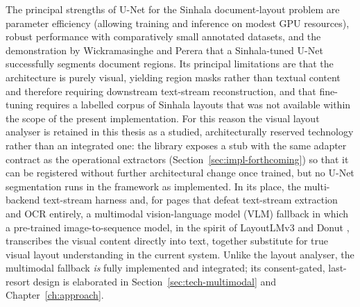 \documentclass[12pt,a4paper,oneside]{report}
\begin{document}
The principal strengths of U-Net for the Sinhala document-layout problem are parameter efficiency (allowing training and inference on modest GPU resources), robust performance with comparatively small annotated datasets, and the demonstration by Wickramasinghe and Perera \cite{wickramasinghe2024unet} that a Sinhala-tuned U-Net successfully segments document regions. Its principal limitations are that the architecture is purely visual, yielding region masks rather than textual content and therefore requiring downstream text-stream reconstruction, and that fine-tuning requires a labelled corpus of Sinhala layouts that was not available within the scope of the present implementation. For this reason the visual layout analyser is retained in this thesis as a studied, architecturally reserved technology rather than an integrated one: the library exposes a stub with the same adapter contract as the operational extractors (Section~\ref{sec:impl-forthcoming}) so that it can be registered without further architectural change once trained, but no U-Net segmentation runs in the framework as implemented. In its place, the multi-backend text-stream harness and, for pages that defeat text-stream extraction and OCR entirely, a multimodal vision-language model (VLM) fallback in which a pre-trained image-to-sequence model, in the spirit of LayoutLMv3 \cite{huang2022layoutlmv3} and Donut \cite{kim2022donut}, transcribes the visual content directly into text, together substitute for true visual layout understanding in the current system. Unlike the layout analyser, the multimodal fallback \textit{is} fully implemented and integrated; its consent-gated, last-resort design is elaborated in Section~\ref{sec:tech-multimodal} and Chapter~\ref{ch:approach}.
\end{document}
